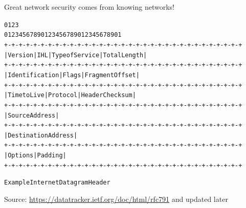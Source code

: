 \documentclass[Screen16to9,17pt]{foils}
\begin{document}
\vskip 5mm

\centerline{\Large Great network security comes from knowing networks!}



\begin{alltt}\footnotesize
    0                   1                   2                   3
    0 1 2 3 4 5 6 7 8 9 0 1 2 3 4 5 6 7 8 9 0 1 2 3 4 5 6 7 8 9 0 1
   +-+-+-+-+-+-+-+-+-+-+-+-+-+-+-+-+-+-+-+-+-+-+-+-+-+-+-+-+-+-+-+-+
   |Version|  IHL  |Type of Service|          Total Length         |
   +-+-+-+-+-+-+-+-+-+-+-+-+-+-+-+-+-+-+-+-+-+-+-+-+-+-+-+-+-+-+-+-+
   |         Identification        |Flags|      Fragment Offset    |
   +-+-+-+-+-+-+-+-+-+-+-+-+-+-+-+-+-+-+-+-+-+-+-+-+-+-+-+-+-+-+-+-+
   |  Time to Live |    Protocol   |         Header Checksum       |
   +-+-+-+-+-+-+-+-+-+-+-+-+-+-+-+-+-+-+-+-+-+-+-+-+-+-+-+-+-+-+-+-+
   |                       Source Address                          |
   +-+-+-+-+-+-+-+-+-+-+-+-+-+-+-+-+-+-+-+-+-+-+-+-+-+-+-+-+-+-+-+-+
   |                    Destination Address                        |
   +-+-+-+-+-+-+-+-+-+-+-+-+-+-+-+-+-+-+-+-+-+-+-+-+-+-+-+-+-+-+-+-+
   |                    Options                    |    Padding    |
   +-+-+-+-+-+-+-+-+-+-+-+-+-+-+-+-+-+-+-+-+-+-+-+-+-+-+-+-+-+-+-+-+

                    Example Internet Datagram Header
\end{alltt}
Source: \url{https://datatracker.ietf.org/doc/html/rfc791} and updated later
\end{document}
